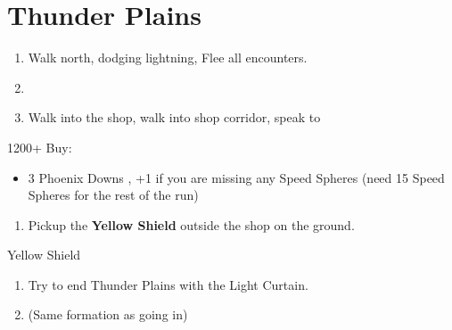 \chapter{Thunder Plains}

\begin{enumerate}
    \item Walk north, dodging lightning, Flee all encounters.
    \item \save
    \item Walk into the shop, walk into shop corridor, speak to \rikku
\end{enumerate}
\begin{shop}{1200+}
    Buy:
    \begin{itemize}
        \item 3 Phoenix Downs
        , +1 if you are missing any Speed Spheres (need 15 Speed Spheres for the rest of the run)
    \end{itemize}
\end{shop}
\begin{enumerate}[resume]
    \item Pickup the \textbf{Yellow Shield} outside the shop on the ground.
\end{enumerate}
\begin{equip}
    \begin{itemize}
        \tidusf Yellow Shield
    \end{itemize}
\end{equip}
\begin{enumerate}[resume]
    \item Try to end Thunder Plains with the Light Curtain.
    \item \formation{\tidus}{\wakka}{\auron} (Same formation as going in)
\end{enumerate}
